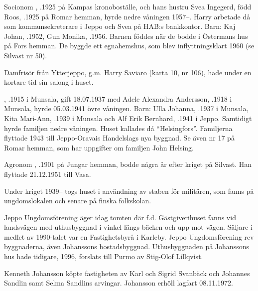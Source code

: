 Socionom , .1925 på Kampas kronoboställe, och hans hustru Svea Ingegerd, född Roos, .1925 på Romar hemman, hyrde nedre våningen 1957--. Harry arbetade då som kommunsekreterare i Jeppo och Svea på HAB:s bankkontor.	Barn:	Kaj Johan, .1952, 	Gun Monika,	.1956.	Barnen föddes när de bodde i Östermans hus på Fors hemman. De byggde ett egnahemshus, som blev inflyttningsklart 1960 (se Silvast nr 50).

Damfrisör  från Ytterjeppo, g.m. Harry Saviaro (karta 10, nr 106), hade under en kortare tid sin salong i huset.

, .1915 i Munsala, gift 18.07.1937 med Adele Alexandra Andersson, .1918 i Munsala, hyrde 05.03.1941  övre våningen. Barn: Ulla Johanna,	.1937 i Munsala, Kita Mari-Ann, .1939 i Munsala och 	Alf Erik Bernhard, .1941 i Jeppo. Samtidigt hyrde familjen  nedre våningen. Huset kallades då ``Helsingfors''. Familjerna flyttade 1943 till Jeppo-Oravais Handelslags nya byggnad. Se även nr 17 på Romar hemman, som har uppgifter om familjen John Helsing.

Agronom , .1901 på Jungar hemman, bodde några år efter kriget på Silvast. Han flyttade 21.12.1951 till Vasa.

Under kriget 1939-- togs huset i användning av staben för militären, som fanns på ungdomslokalen och senare på finska folkskolan.




Jeppo Ungdomsförening äger idag tomten där f.d. Gästgiverihuset	fanns vid landsvägen med uthusbyggnad i vinkel längs bäcken och upp 	mot vägen. Säljare i medlet av 1990-talet var en Fastighetsbyrå i Karleby. Jeppo Ungdomsförening rev byggnaderna, även Johanssons bostadsbyggnad. Uthusbyggnaden på Johanssons hus hade tidigare, 1996, forslats till Purmo av Stig-Olof Lillqvist.



Kenneth Johansson köpte fastigheten av Karl och Sigrid Svanbäck	och Johannes Sandlin samt Selma Sandlins arvingar. Johansson erhöll lagfart 08.11.1972.


